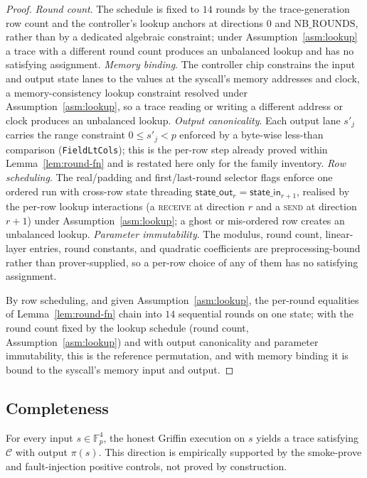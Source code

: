 \begin{proof}
\emph{Round count}. The schedule is fixed to $14$ rounds by the trace-generation row count and the controller's lookup anchors at directions $0$ and $\mathrm{NB\_ROUNDS}$, rather than by a dedicated algebraic constraint; under Assumption~\ref{asm:lookup} a trace with a different round count produces an unbalanced lookup and has no satisfying assignment. \emph{Memory binding}. The controller chip constrains the input and output state lanes to the values at the syscall's memory addresses and clock, a memory-consistency lookup constraint resolved under Assumption~\ref{asm:lookup}, so a trace reading or writing a different address or clock produces an unbalanced lookup. \emph{Output canonicality}. Each output lane $s'_j$ carries the range constraint $0\le s'_j<p$ enforced by a byte-wise less-than comparison (\texttt{FieldLtCols}); this is the per-row step already proved within Lemma~\ref{lem:round-fn} and is restated here only for the family inventory. \emph{Row scheduling}. The real/padding and first/last-round selector flags enforce one ordered run with cross-row state threading $\mathsf{state\_out}_r=\mathsf{state\_in}_{r+1}$, realised by the per-row lookup interactions (a \textsc{receive} at direction $r$ and a \textsc{send} at direction $r{+}1$) under Assumption~\ref{asm:lookup}; a ghost or mis-ordered row creates an unbalanced lookup. \emph{Parameter immutability}. The modulus, round count, linear-layer entries, round constants, and quadratic coefficients are preprocessing-bound rather than prover-supplied, so a per-row choice of any of them has no satisfying assignment.

By row scheduling, and given Assumption~\ref{asm:lookup}, the per-round equalities of Lemma~\ref{lem:round-fn} chain into $14$ sequential rounds on one state; with the round count fixed by the lookup schedule (round count, Assumption~\ref{asm:lookup}) and with output canonicality and parameter immutability, this is the reference permutation, and with memory binding it is bound to the syscall's memory input and output.
\end{proof}

\subsection{Completeness}\label{app:air-completeness}
\begin{lemma}[Completeness]\label{lem:air-complete}
For every input $s\in\mathbb{F}_p^{4}$, the honest Griffin execution on $s$ yields a trace satisfying $\mathcal{C}$ with output $\pi(s)$. This direction is empirically supported by the smoke-prove and fault-injection positive controls, not proved by construction.
\end{lemma}

